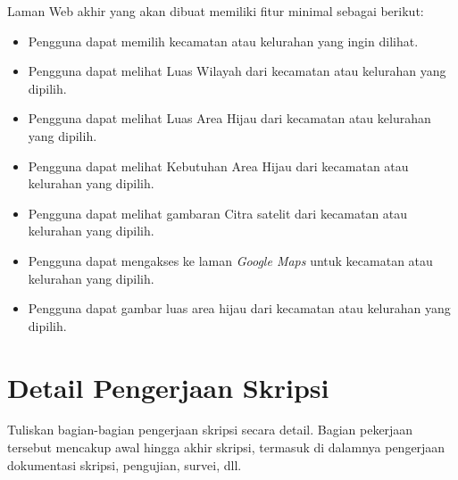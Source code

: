 \documentclass[a4paper,twoside]{article}
\begin{document}
Laman Web akhir yang akan dibuat memiliki fitur minimal sebagai berikut:
\begin{itemize}
	\item Pengguna dapat memilih kecamatan atau kelurahan yang ingin dilihat.
	\item Pengguna dapat melihat Luas Wilayah dari kecamatan atau kelurahan yang dipilih.
	\item Pengguna dapat melihat Luas Area Hijau dari kecamatan atau kelurahan yang dipilih.
	\item Pengguna dapat melihat Kebutuhan Area Hijau dari kecamatan atau kelurahan yang dipilih.
	\item Pengguna dapat melihat gambaran Citra satelit dari kecamatan atau kelurahan yang dipilih.
	\item Pengguna dapat mengakses ke laman \emph{Google Maps} untuk kecamatan atau kelurahan yang dipilih.
	\item Pengguna dapat gambar luas area hijau dari kecamatan atau kelurahan yang dipilih.
		
\end{itemize}

\section{Detail Pengerjaan Skripsi}
Tuliskan bagian-bagian pengerjaan skripsi secara detail. Bagian pekerjaan tersebut mencakup awal hingga akhir skripsi, termasuk di dalamnya pengerjaan dokumentasi skripsi, pengujian, survei, dll.
\end{document}
